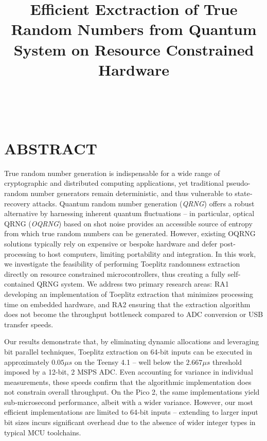 \documentclass{sigchi}
\def\plaintitle{Efficient Exctraction of True Random Numbers from Quantum System on Resource Constrained Hardware}
\begin{document}
\title{\plaintitle}

\author{%
	\\
	\\
}

\maketitle


\section{ABSTRACT}\label{abstract}

True random number generation is indispensable for a wide range of cryptographic and distributed computing applications, yet traditional pseudo-random number generators remain deterministic, and thus vulnerable to state‐recovery attacks. Quantum random number generation (\emph{QRNG}) offers a robust alternative by harnessing inherent quantum fluctuations -- in particular, optical QRNG (\emph{OQRNG}) based on shot noise provides an accessible source of entropy from which true random numbers can be generated. However, existing OQRNG solutions typically rely on expensive or bespoke hardware and defer post‐processing to host computers, limiting portability and integration. In this work, we investigate the feasibility of performing Toeplitz randomness extraction directly on resource constrained microcontrollers, thus creating a fully self‐contained QRNG system. We address two primary research areas: RA1 developing an implementation of Toeplitz extraction that minimizes processing time on embedded hardware, and RA2 ensuring that the extraction algorithm does not become the throughput bottleneck compared to ADC conversion or USB transfer speeds.

Our results demonstrate that, by eliminating dynamic allocations and leveraging bit parallel techniques, Toeplitz extraction on 64-bit inputs can be executed in approximately \(0.05 \mu s\) on the Teensy 4.1 -- well below the \(2.667 \mu s\) threshold imposed by a 12-bit, 2 MSPS ADC. Even accounting for variance in individual measurements, these speeds confirm that the algorithmic implementation does not constrain overall throughput. On the Pico 2, the same implementations yield sub‐microsecond performance, albeit with a wider variance. However, our most efficient implementations are limited to 64‐bit inputs -- extending to larger input bit sizes incurs significant overhead due to the absence of wider integer types in typical MCU toolchains.
\end{document}
